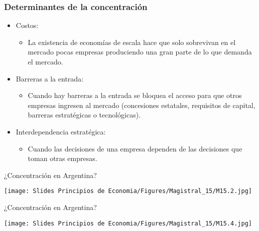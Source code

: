 \documentclass{beamer}
\begin{document}
\begin{frame}
\frametitle{Determinantes de la concentración}
\begin{itemize}
    \item Costos:
        \begin{itemize}
        \item La existencia de economías de escala hace que solo sobrevivan en el mercado pocas empresas produciendo una gran parte de lo que demanda el mercado. 
        \end{itemize}
    \vspace{2mm}
    \item Barreras a la entrada:
        \begin{itemize}
        \item Cuando hay barreras a la entrada se bloquea el acceso para que otros empresas ingresen al mercado (concesiones estatales, requisitos de capital, barreras estratégicas o tecnológicas). 
        \end{itemize}
    \vspace{2mm}
    \item Interdependencia estratégica:
        \begin{itemize}
        \item Cuando las decisiones de una empresa dependen de las decisiones que toman otras empresas.
        \end{itemize}
    \end{itemize}
\end{frame}

\begin{frame}{¿Concentración en Argentina?}

\centering
\texttt{[image: Slides Principios de Economia/Figures/Magistral\_15/M15.2.jpg]}

\end{frame}


\begin{frame}{¿Concentración en Argentina?}

\centering
\texttt{[image: Slides Principios de Economia/Figures/Magistral\_15/M15.4.jpg]}


\end{frame}

\end{document}
